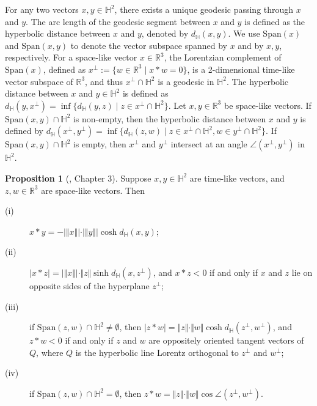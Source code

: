 \documentclass[12pt]{amsart}
\theoremstyle{definition}
\newtheorem{proposition}[theorem]{Proposition}
\begin{document}
For any two vectors $x,y\in \mathbb{H}^2$, there exists a unique geodesic passing through $x$ and $y$.
The arc length of the geodesic segment between $x$ and $y$ is defined as the hyperbolic distance between $x$ and $y$, denoted by $d_{\mathbb{H}}(x,y)$.
We use $\textrm{Span}(x)$ and $\textrm{Span}(x,y)$ to
denote the vector subspace spanned by $x$ and by $x,y$, respectively.
For a space-like vector $x\in \mathbb{R}^3$,
the Lorentzian complement of $\textrm{Span}(x)$, defined as $x^{\bot}:=\{w\in \mathbb{R}^3 \mid x*w=0\}$, is a 2-dimensional time-like vector subspace of $\mathbb{R}^3$, and thus $x^{\bot}\cap \mathbb{H}^2$ is a geodesic in $\mathbb{H}^2$.
The hyperbolic distance between $x$ and $y\in \mathbb{H}^2$ is defined as $d_{\mathbb{H}}(y,x^\bot)=\inf\{d_{\mathbb{H}}(y,z)\mid z\in x^\bot\cap \mathbb{H}^2\}$.
Let $x,y\in \mathbb{R}^3$ be space-like vectors.
If $\textrm{Span}(x,y)\cap \mathbb{H}^2$ is non-empty, then the hyperbolic distance between $x$ and $y$ is defined by $d_{\mathbb{H}}(x^\bot,y^\bot)=\inf\{d_{\mathbb{H}}(z,w)\mid z\in x^\bot\cap \mathbb{H}^2, w\in y^\bot\cap \mathbb{H}^2\}$.
If $\textrm{Span}(x,y)\cap \mathbb{H}^2$ is empty, then $x^\bot$ and $y^\bot$ intersect at an angle $\angle(x^\bot,y^\bot)$ in $\mathbb{H}^2$.

\begin{proposition}[\cite{Ratcliffe}, Chapter 3]\label{Prop: Ratcliffe 1}
Suppose $x,y\in\mathbb{H}^2$ are time-like vectors, and $z,w\in \mathbb{R}^3$ are space-like vectors. Then
\begin{description}
\item[(i)] $x*y=-\vert\Vert x\Vert\vert\cdot\vert\Vert y\Vert\vert\cosh d_{\mathbb{H}}(x,y)$;
\item[(ii)] $\vert x*z\vert=\vert\Vert x\Vert\vert\cdot \Vert z\Vert \sinh d_{\mathbb{H}}(x,z^\bot)$, and $x*z<0$ if and only if $x$ and $z$ lie on opposite sides of the hyperplane $z^\bot$;
\item[(iii)] if $\textrm{Span}(z,w)\cap \mathbb{H}^2\neq \emptyset$, then $|z*w|=\Vert z\Vert\cdot \Vert w\Vert\cosh d_{\mathbb{H}}(z^\bot,w^\bot)$, and $z*w<0$ if and only if $z$ and $w$ are oppositely oriented tangent vectors of $Q$, where $Q$ is the hyperbolic line Lorentz orthogonal to $z^\bot$ and $w^\bot$;
\item[(iv)] if $\textrm{Span}(z,w)\cap \mathbb{H}^2=\emptyset$, then $z*w=\Vert z\Vert \cdot\Vert w\Vert\cos \angle(z^\bot,w^\bot)$.
\end{description}
\end{proposition}
\end{document}
